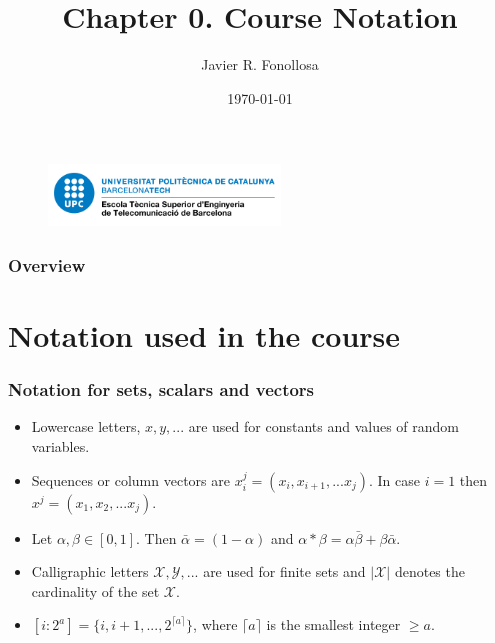 \documentclass{beamer}
\title[Notation]{Chapter 0. Course Notation} %
\author{Javier R. Fonollosa} %
\institute[ETSETB-TSC] %
{
Universitat Polit\`{e}cnica de Catalunya \\ %
\medskip
\textit{javier.fonollosa@upc.edu} %
}
\date{\today} %
\begin{document}
\begin{frame}
\titlepage %
\begin{figure}
    \centering
    \includegraphics[width = 0.55\textwidth]{img/ETSETB-positiu-p3005.png}
\end{figure}
\end{frame}

\begin{frame}
\frametitle{Overview} %
  \tableofcontents
\end{frame}


\section{Notation used in the course} %


\begin{frame}
\frametitle{Notation for sets, scalars and vectors}
\begin{itemize}
\item Lowercase letters, $x,y,...$ are used for constants and values of random variables. \item Sequences or column vectors are $x_i^j=(x_i, x_{i+1}, ...x_j)$. In case $i=1$ then $x^j=(x_1, x_2, ...x_j)$.
\item Let $\alpha, \beta \in [0,1]$. Then $\bar{\alpha}=(1-\alpha)$ and $\alpha * \beta = \alpha \bar{\beta}+\beta \bar{\alpha}$.
\item Calligraphic letters $\mathcal{X,Y, ...}$ are used for finite sets and $|\mathcal{X}|$ denotes the cardinality of the set $\mathcal{X}$.
\item $[i:2^a]=\{i, i+1, ..., 2^{\lceil{a}\rceil}\}$, where $\lceil{a}\rceil$ is the smallest integer $\geq a$.
\end{itemize}
\end{frame}
\end{document}
